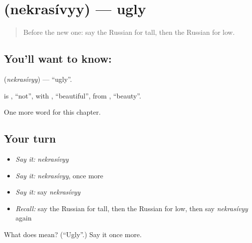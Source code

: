 \section[\texorpdfstring{\ru{некрасивый} (nekrasívyy)}{некрасивый (nekrasívyy)}]{ (nekrasívyy) — ugly}

\label{lesson:RU-C243-nekrasivyy}



\begin{quote}
Before the new one: say the Russian for tall, then the Russian for low.
\end{quote}

\subsection*{You'll want to know: }
\textbf{} (\emph{nekrasívyy}) — \textquotedblleft{}ugly\textquotedblright{}.

\begin{cousinweb}
\textbf{} is \emph{}, \textquotedblleft{}not\textquotedblright{}, with \emph{}, \textquotedblleft{}beautiful\textquotedblright{}, from \emph{}, \textquotedblleft{}beauty\textquotedblright{}.
\end{cousinweb}

\begin{grammarlens}[title={What you've built}]
One more word for this chapter.
\end{grammarlens}

\subsection*{Your turn}
\begin{itemize}
\raggedright
  \item \emph{Say it:} \emph{nekrasívyy}
  \item \emph{Say it:} \emph{nekrasívyy}, once more
  \item \emph{Say it:} say \emph{nekrasívyy}
  \item \emph{Recall:} say the Russian for tall, then the Russian for low, then say \emph{nekrasívyy} again
\end{itemize}

\begin{tcolorbox}[breakable,colback=teal!4,colframe=teal!35!black,title={Before you move on}]
What does  mean? (\textquotedblleft{}Ugly\textquotedblright{}.) Say it once more.
\end{tcolorbox}
